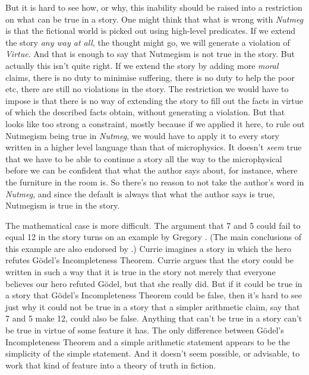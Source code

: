 But it is hard to see how, or why, this inability should be raised into a restriction on what can be true in a story. One might think that what is wrong with \textit{Nutmeg }is that the fictional world is picked out using high-level predicates. If we extend the story \textit{any way at all}, the thought might go, we will generate a violation of \textit{Virtue}. And that is enough to say that Nutmegism is not true in the story. But actually this isn't quite right. If we extend the story by adding more \textit{moral }claims, there is no duty to minimise suffering, there is no duty to help the poor etc, there are still no violations in the story. The restriction we would have to impose is that there is no way of extending the story to fill out the facts in virtue of which the described facts obtain, without generating a violation. But that looks like too strong a constraint, mostly because if we applied it here, to rule out Nutmegism being true in \textit{Nutmeg}, we would have to apply it to every story written in a higher level language than that of microphysics. It doesn't \textit{seem }true that we have to be able to continue a story all the way to the microphysical before we can be confident that what the author says about, for instance, where the furniture in the room is. So there's no reason to not take the author's word in \textit{Nutmeg}, and since the default is always that what the author says is true, Nutmegism is true in the story.

The mathematical case is more difficult. The argument that 7 and 5 could fail to equal 12 in the story turns on an example by Gregory \citet{Currie1990}. (The main conclusions of this example are also endorsed by \citet{Byrne1993}.) Currie imagines a story in which the hero refutes G\"odel's Incompleteness Theorem. Currie argues that the story could be written in such a way that it is true in the story not merely that everyone believes our hero refuted G\"odel, but that she really did. But if it could be true in a story that G\"odel's Incompleteness Theorem could be false, then it's hard to see just why it could not be true in a story that a simpler arithmetic claim, say that 7 and 5 make 12, could also be false. Anything that can't be true in a story can't be true in virtue of some feature it has. The only difference between G\"odel's Incompleteness Theorem and a simple arithmetic statement appears to be the simplicity of the simple statement. And it doesn't seem possible, or advisable, to work that kind of feature into a theory of truth in fiction.


